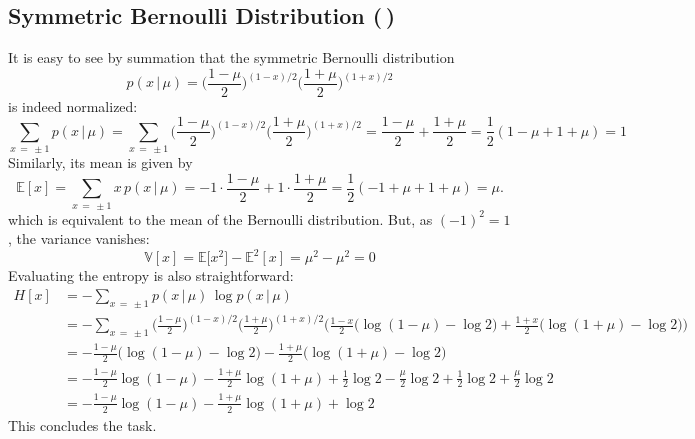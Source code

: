\documentclass[11pt, a4paper]{scrartcl}
\newcommand{\E}{\mathbb{E}}
\newcommand{\Var}{\mathbb{V}}
\newcommand{\given}{\,\vert\,}
\newcommand{\diffstar}{\texorpdfstring{\raisebox{-1pt}{\resizebox{!}{8pt}{\(\star\)}}}{*}}
\newcommand{\twostar}  {(\diffstar\,\diffstar)}
\begin{document}
		\subsection{Symmetric Bernoulli Distribution  \twostar}
			It is easy to see by summation that the symmetric Bernoulli distribution
			\begin{equation}
				p(x \given \mu) = \bigg( \frac{1 - \mu}{2} \bigg)^{(1 - x) / 2} \bigg( \frac{1 + \mu}{2} \bigg)^{(1 + x) / 2}
			\end{equation}
			is indeed normalized:
			\begin{equation}
				\sum_{x \,=\, \pm 1} p(x \given \mu)
					= \sum_{x \,=\, \pm 1} \bigg( \frac{1 - \mu}{2} \bigg)^{(1 - x) / 2} \bigg( \frac{1 + \mu}{2} \bigg)^{(1 + x) / 2}
					= \frac{1 - \mu}{2} + \frac{1 + \mu}{2}
					= \frac{1}{2} (1 - \mu + 1 + \mu)
					= 1
			\end{equation}
			Similarly, its mean is given by
			\begin{equation}
				\E[x]
					= \sum_{x \,=\, \pm 1} x \, p(x \given \mu)
					= -1 \cdot \frac{1 - \mu}{2} + 1 \cdot \frac{1 + \mu}{2}
					= \frac{1}{2} (-1 + \mu + 1 + \mu)
					= \mu.
			\end{equation}
			which is equivalent to the mean of the Bernoulli distribution. But, as \( (-1)^2 = 1 \), the variance vanishes:
			\begin{equation}
				\Var[x]
					= \E\big[x^2\big] - \E^2[x]
					= \mu^2 - \mu^2
					= 0
			\end{equation}
			Evaluating the entropy is also straightforward:
			\begin{align}
				H[x]
					&= -\!\!\sum_{x \,=\, \pm 1} p(x \given \mu) \, \log p(x \given \mu) \\
					&= -\!\!\sum_{x \,=\, \pm 1} \bigg( \frac{1 - \mu}{2} \bigg)^{(1 - x) / 2} \bigg( \frac{1 + \mu}{2} \bigg)^{(1 + x) / 2} \bigg( \frac{1 - x}{2} \big(\! \log(1 - \mu) - \log 2 \big) + \frac{1 + x}{2} \big(\! \log(1 + \mu) - \log 2 \big) \!\bigg) \\
					&= -\frac{1 - \mu}{2} \big(\! \log(1 - \mu) - \log 2 \big) - \frac{1 + \mu}{2} \big(\! \log(1 + \mu) - \log 2 \big) \\
					&= -\frac{1 - \mu}{2} \log(1 - \mu) - \frac{1 + \mu}{2} \log(1 + \mu) + \frac{1}{2} \log 2 - \frac{\mu}{2} \log 2 + \frac{1}{2} \log 2 + \frac{\mu}{2} \log 2 \\
					&= -\frac{1 - \mu}{2} \log(1 - \mu) - \frac{1 + \mu}{2} \log(1 + \mu) + \log 2
			\end{align}
			This concludes the task.
\end{document}
